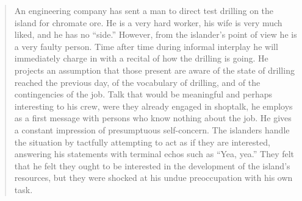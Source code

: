 \documentclass[twoside,symmetric,nobib,justified]{tufte-book}
\begin{document}
\begin{quote}
An engineering company has sent a man to direct test drilling on the
island for chromate ore. He is a very hard worker, his wife is very much
liked, and he has no ``side.'' However, from the islander's point of
view he is a very faulty person. Time after time during informal
interplay he will immediately charge in with a recital of how the
drilling is going. He projects an assumption that those present are
aware of the state of drilling reached the previous day, of the
vocabulary of drilling, and of the contingencies of the job. Talk that
would be meaningful and perhaps interesting to his crew, were they
already engaged in shoptalk, he employs as a first message with persons
who know nothing about the job. He gives a constant impression of
presumptuous self-concern. The islanders handle the situation by
tactfully attempting to act as if they are interested, answering his
statements with terminal echos such as ``Yea, yea.'' They felt that he
felt they ought to be interested in the development of the island's
resources, but they were shocked at his undue preoccupation with his own
task.
\end{quote}
\end{document}
